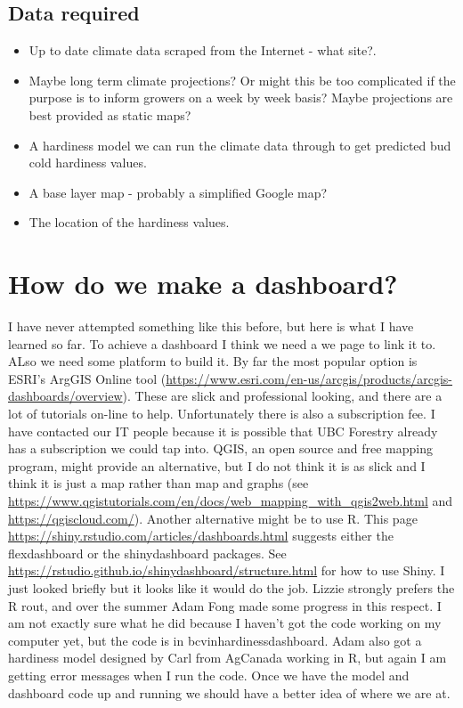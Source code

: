 \documentclass[11pt,letter]{article}
\begin{document}
\subsection{Data required}
\begin{itemize}
	\item Up to date climate data scraped from the Internet - what site?. 
	\item Maybe long term climate projections? Or might this be too complicated if the purpose is to inform growers on a week by week basis? Maybe projections are best provided as static maps?
	\item A hardiness model we can run the climate data through to get predicted bud cold hardiness values.  
	\item A base layer map - probably a simplified Google map?
	\item The location of the hardiness values. 
\end{itemize}

\section{How do we make a dashboard?}
I have never attempted something like this before, but here is what I have learned so far. To achieve a dashboard I think we need a we page to link it to. ALso we need some platform to build it. By far the most popular option is ESRI's ArgGIS Online tool (\url{https://www.esri.com/en-us/arcgis/products/arcgis-dashboards/overview}). These are slick and professional looking, and there are a lot of tutorials on-line to help. Unfortunately there is also a subscription fee. I have contacted our IT people because it is possible that UBC Forestry already has a subscription we could tap into. QGIS, an open source and free mapping program, might provide an alternative, but I do not think it is as slick and I think it is just a map rather than map and graphs (see \url{https://www.qgistutorials.com/en/docs/web_mapping_with_qgis2web.html}  and \url{https://qgiscloud.com/}). Another alternative might be to use R. This page \url{https://shiny.rstudio.com/articles/dashboards.html} suggests either the flexdashboard or the shinydashboard packages. See \url{https://rstudio.github.io/shinydashboard/structure.html} for how to use Shiny. I just looked briefly but it looks like it would do the job. Lizzie strongly prefers the R rout, and over the summer Adam Fong made some progress in this respect. I am not exactly sure what he did because I haven't got the code working on my computer yet, but the code is in bcvin\/hardiness\/dashboard. Adam also got a hardiness model designed by Carl from AgCanada working in R, but again I am getting error messages when I run the code. Once we have the model and dashboard code up and running we should have a better idea of where we are at.           
\end{document}
